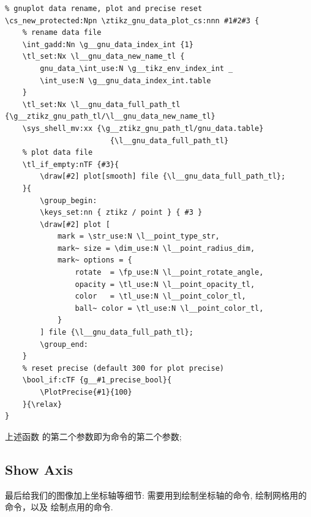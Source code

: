 \begin{verbatim}
% gnuplot data rename, plot and precise reset
\cs_new_protected:Npn \ztikz_gnu_data_plot_cs:nnn #1#2#3 {
    % rename data file
    \int_gadd:Nn \g__gnu_data_index_int {1}
    \tl_set:Nx \l__gnu_data_new_name_tl {
        gnu_data_\int_use:N \g__tikz_env_index_int _
        \int_use:N \g__gnu_data_index_int.table
    }
    \tl_set:Nx \l__gnu_data_full_path_tl {\g__ztikz_gnu_path_tl/\l__gnu_data_new_name_tl}
    \sys_shell_mv:xx {\g__ztikz_gnu_path_tl/gnu_data.table}
                        {\l__gnu_data_full_path_tl}
    % plot data file
    \tl_if_empty:nTF {#3}{
        \draw[#2] plot[smooth] file {\l__gnu_data_full_path_tl};
    }{
        \group_begin:
        \keys_set:nn { ztikz / point } { #3 }
        \draw[#2] plot [
            mark = \str_use:N \l__point_type_str, 
            mark~ size = \dim_use:N \l__point_radius_dim,
            mark~ options = {
                rotate  = \fp_use:N \l__point_rotate_angle, 
                opacity = \tl_use:N \l__point_opacity_tl, 
                color   = \tl_use:N \l__point_color_tl,
                ball~ color = \tl_use:N \l__point_color_tl,
            }
        ] file {\l__gnu_data_full_path_tl};
        \group_end:
    }
    % reset precise (default 300 for plot precise)
    \bool_if:cTF {g__#1_precise_bool}{
        \PlotPrecise{#1}{100}
    }{\relax}
}
\end{verbatim}

上述函数 的第二个参数即为\cmd{\Plot}命令的第二个参数;

\subsection{Show Axis}
最后给我们的图像加上坐标轴等细节: 需要用到绘制坐标轴的\cmd{\ShowAxis}命令, 绘制网格用的\cmd{\ShowGrid}命令，以及
绘制点用的\cmd{\ShowPoint}命令.


